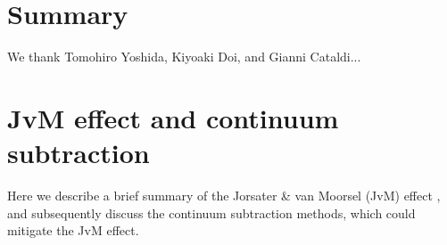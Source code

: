 \documentclass[linenumbers, twocolumn, twocolappendix, astrosymb, times]{aastex631}
\begin{document}
\section{Summary} \label{sec:summary}


\begin{acknowledgments}
We thank Tomohiro Yoshida, Kiyoaki Doi, and Gianni Cataldi...
\end{acknowledgments}

%

\vspace{5mm}





\appendix
\restartappendixnumbering
\section{JvM effect and continuum subtraction}\label{appendix:JvM_effect}
Here we describe a brief summary of the Jorsater \& van Moorsel (JvM) effect \citep{JvM, Czekala2021}, and subsequently discuss the continuum subtraction methods, which could mitigate the JvM effect.
\end{document}
